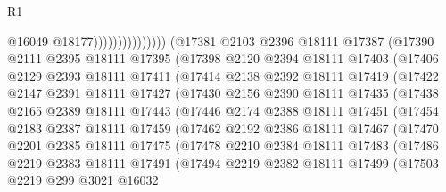 \begin{lexlean}{R1}
\begin{coremodule}
                                      @16049
                                      @18177)))))))))))))))
        (@17381
          @2103
          @2396
          @18111
          @17387
          (@17390
            @2111
            @2395
            @18111
            @17395
            (@17398
              @2120
              @2394
              @18111
              @17403
              (@17406
                @2129
                @2393
                @18111
                @17411
                (@17414
                  @2138
                  @2392
                  @18111
                  @17419
                  (@17422
                    @2147
                    @2391
                    @18111
                    @17427
                    (@17430
                      @2156
                      @2390
                      @18111
                      @17435
                      (@17438
                        @2165
                        @2389
                        @18111
                        @17443
                        (@17446
                          @2174
                          @2388
                          @18111
                          @17451
                          (@17454
                            @2183
                            @2387
                            @18111
                            @17459
                            (@17462
                              @2192
                              @2386
                              @18111
                              @17467
                              (@17470
                                @2201
                                @2385
                                @18111
                                @17475
                                (@17478
                                  @2210
                                  @2384
                                  @18111
                                  @17483
                                  (@17486
                                    @2219
                                    @2383
                                    @18111
                                    @17491
                                    (@17494
                                      @2219
                                      @2382
                                      @18111
                                      @17499
                                      (@17503
                                        @2219
                                        @299
                                        @3021
                                        @16032

\end{coremodule}
\end{lexlean}
